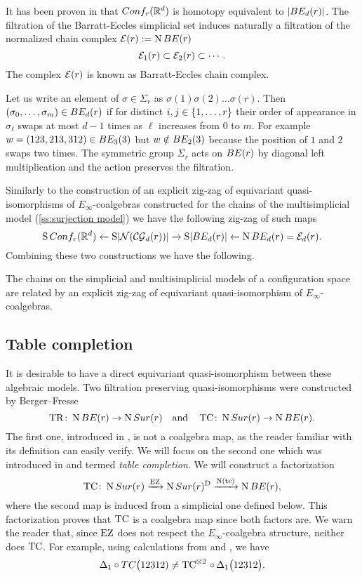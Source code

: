 It has been proven in \cite{kashiwabara1993confcomplex} that $Conf_{r}(\mathbb{R}^d)$ is homotopy equivalent to $\lvert BE_{d}(r)\rvert $. 
The filtration of the Barratt-Eccles simplicial set induces naturally a filtration of the normalized chain complex $\mathcal{E}(r):=\operatorname{N} BE(r)$
\[
\mathcal{E}_{1}(r) \subset \mathcal{E}_{2}(r) \subset \dotsb \,.
\]
The complex $\mathcal{E}(r)$ is known as Barratt-Eccles chain complex.

Let us write an element of $\sigma \in \Sigma_r$ as $\sigma(1)\sigma(2) \dots \sigma(r)$.
Then $(\sigma_0,\dots,\sigma_m) \in BE_{d}(r)$ if for distinct $i,j \in \{1,\dots,r\}$ their order of appearance in $\sigma_\ell$ swaps at most $d-1$ times as $\ell$ increases from $0$ to $m$.
For example $w = (123,213,312) \in BE_{3}(3)$ but $w \notin BE_{2}(3)$ because the position of $1$ and $2$ swaps two times.
The symmetric group $\Sigma_r$ acts on $BE(r)$ by diagonal left multiplication and the action preserves the filtration.

Similarly to the construction of an explicit zig-zag of equivariant quasi-isomorphisms of $E_\infty$-coalgebras constructed for the chains of the multisimplicial model (\cref{ss:surjection model}) we have the following zig-zag of such maps
\[
\operatorname{S}Conf_{r}(\mathbb{R}^d) \leftarrow \operatorname{S} \lvert\mathcal{N}(\mathcal{CG}_{d}(r))\rvert \to \operatorname{S}\lvert BE_{d}(r)\rvert \leftarrow \operatorname{N} BE_{d}(r) = \mathcal{E}_d(r).
\]
Combining these two constructions we have the following.
\begin{theorem}
	The chains on the simplicial and multisimplicial models of a configuration space are related by an explicit zig-zag of equivariant quasi-isomorphism of $E_\infty$-coalgebras.
\end{theorem}

\subsection{Table completion}\label{ss:table completion}

It is desirable to have a direct equivariant quasi-isomorphism between these algebraic models.
Two filtration preserving quasi-isomorphisms were constructed by Berger--Fresse
\[
\operatorname{TR} \colon \operatorname{N}BE(r) \to \operatorname{N}Sur(r)
\quad \text{and} \quad
\operatorname{TC} \colon \operatorname{N}Sur(r) \to \operatorname{N} BE(r).
\]
The first one, introduced in \cite[1$\cdot$3]{berger2004combinatorial}, is not a coalgebra map, as the reader familiar with its definition can easily verify.
We will focus on the second one which was introduced in \cite{berger2002prismatic} and termed \textit{table completion}.
We will construct a factorization
\[
\operatorname{TC} \colon \operatorname{N}Sur(r) \xrightarrow{\operatorname{EZ}} \operatorname{N}Sur(r)^{\mathrm{D}} \xrightarrow{\operatorname{N}(\operatorname{tc})} \operatorname{N} BE(r),
\]
where the second map is induced from a simplicial one defined below.
This factorization proves that $\operatorname{TC}$ is a coalgebra map since both factors are.
We warn the reader that, since $\operatorname{EZ}$ does not respect the $E_\infty$-coalgebra structure,
neither does $\operatorname{TC}$.
For example, using calculations from \cite{medina2022cube_einfty} and \cite{berger2002prismatic}, we have
\[
\Delta_1 \circ TC\big(12312) \neq
\operatorname{TC} ^{\otimes 2}\, \circ \, \Delta_1\big(12312\big).
\]

